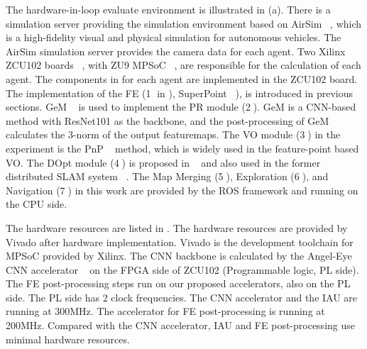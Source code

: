 The hardware-in-loop evaluate environment is illustrated in (a). There is a simulation server providing the simulation environment based on AirSim  ~\cite{shah2018airsim}, which is a high-fidelity visual and physical simulation for autonomous vehicles. The AirSim simulation server provides the camera data for each agent. Two Xilinx ZCU102 boards  ~\cite{zcu102}, with ZU9 MPSoC  ~\cite{MPSoC}, are responsible for the calculation of each agent. 
The components in  for each agent are implemented in the ZCU102 board. The implementation of the FE (\textcircled{1} in ), SuperPoint ~\cite{detone2018superpoint}), is introduced in previous sections. GeM  ~\cite{radenovic2018fine} is used to implement the PR module (\textcircled{2}). GeM is a CNN-based method with ResNet101 \cite{he2016deep} as the backbone, and the post-processing of GeM calculates the 3-norm of the output featuremaps.
The VO module (\textcircled{3}) in the experiment is the PnP  ~\cite{LepetitMoreno-Noguer-EPnP} method, which is widely used in the feature-point based VO. 
The DOpt module (\textcircled{4}) is proposed in  ~\cite{Choudhary:2017e66} and also used in the former distributed SLAM system ~\cite{cieslewski2018data}. 
The Map Merging  (\textcircled{5}), Exploration (\textcircled{6}), and Navigation (\textcircled{7}) in this work are provided by the ROS framework and running on the CPU side. 

The hardware resources are listed in . The hardware resources are provided by Vivado after hardware implementation. Vivado is the development toolchain for MPSoC provided by Xilinx. The CNN backbone is calculated by the Angel-Eye CNN accelerator ~\cite{guo2017angel} on the FPGA side of ZCU102 (Programmable logic, PL side). The FE post-processing steps run on our proposed accelerators, also on the PL side. The PL side has 2 clock frequencies. The CNN accelerator and the IAU are running at 300MHz. The accelerator for FE post-processing is running at 200MHz. Compared with the CNN accelerator, IAU and FE post-processing use minimal hardware resources.

